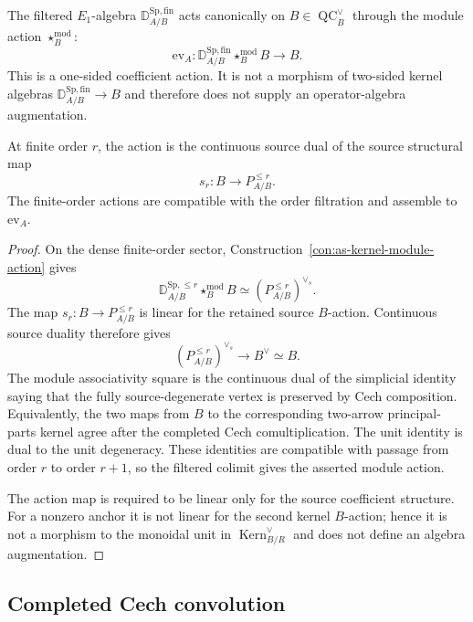 \begin{proposition}
\label{prop:as-canonical-distribution-module}
The filtered $E_1$-algebra
$\mathbb D_{A/B}^{\mathrm{Sp,fin}}$ acts canonically on
$B\in\operatorname{QC}^{\vee}_B$ through the module action
$\star_B^{\mathrm{mod}}$:
\[
\boxed{
    \mathrm{ev}_A:
    \mathbb D_{A/B}^{\mathrm{Sp,fin}}
    \star_B^{\mathrm{mod}}B
    \longrightarrow B.
}
\]
This is a one-sided coefficient action.  It is not a morphism of
two-sided kernel algebras
$\mathbb D_{A/B}^{\mathrm{Sp,fin}}\to B$ and therefore does not supply an
operator-algebra augmentation.

At finite order $r$, the action is the continuous source dual of the source
structural map
\[
    s_r:B\longrightarrow P_{A/B}^{\le r}.
\]
The finite-order actions are compatible with the order filtration and assemble
to $\mathrm{ev}_A$.
\end{proposition}

\begin{proof}
On the dense finite-order sector,
Construction~\ref{con:as-kernel-module-action} gives
\[
    \mathbb D_{A/B}^{\mathrm{Sp},\le r}
    \star_B^{\mathrm{mod}}B
    \simeq
    \left(P_{A/B}^{\le r}\right)^{\vee_s}.
\]
The map $s_r:B\to P_{A/B}^{\le r}$ is linear for the retained source
$B$-action.  Continuous source duality therefore gives
\[
    \left(P_{A/B}^{\le r}\right)^{\vee_s}
    \longrightarrow
    B^\vee\simeq B.
\]
The module associativity square is the continuous dual of the simplicial
identity saying that the fully source-degenerate vertex is preserved by Cech
composition.  Equivalently, the two maps from $B$ to the corresponding
two-arrow principal-parts kernel agree after the completed Cech
comultiplication.  The unit identity is dual to the unit degeneracy.  These
identities are compatible with passage from order $r$ to order $r+1$, so the
filtered colimit gives the asserted module action.

The action map is required to be linear only for the source coefficient
structure.  For a nonzero anchor it is not linear for the second kernel
$B$-action; hence it is not a morphism to the monoidal unit in
$\operatorname{Kern}^{\vee}_{B/R}$ and does not define an algebra
augmentation.
\end{proof}

\subsection{Completed Cech convolution}

